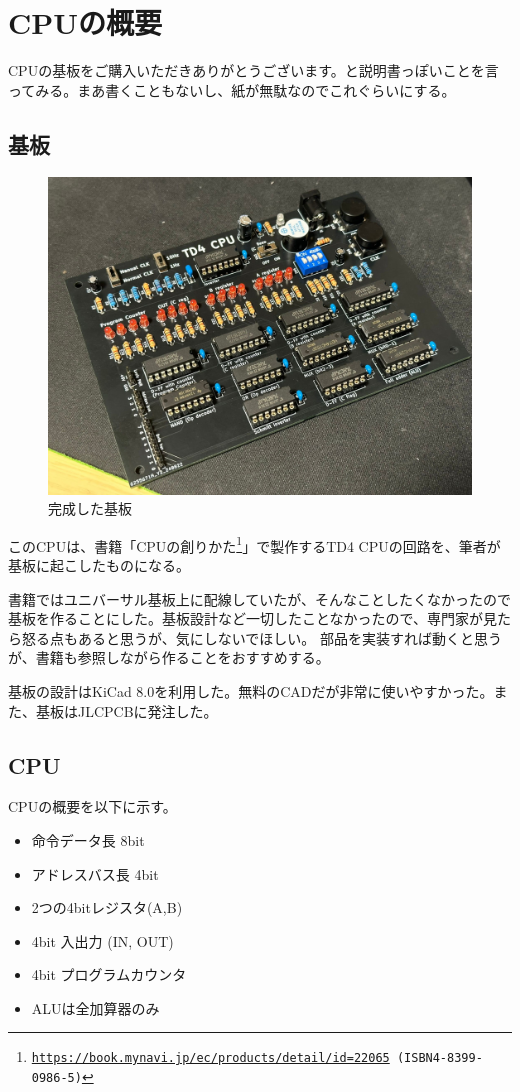 \documentclass[xelatex,a5paper,ja=standard, openany]{bxjsbook}
\title{}
\author{}
\date{}
\begin{document}
\tableofcontents

\chapter{CPUの概要}

CPUの基板をご購入いただきありがとうございます。と説明書っぽいことを言ってみる。まあ書くこともないし、紙が無駄なのでこれぐらいにする。

\section{基板}

\begin{figure}[h]
    \centering
    \includegraphics[width=0.6\linewidth]{figure/kiban.jpeg}
    \caption{完成した基板}
    \label{fig:kanseikiban}
\end{figure}

このCPUは、書籍「CPUの創りかた\footnote{\texttt{\url{https://book.mynavi.jp/ec/products/detail/id=22065} (ISBN4-8399-0986-5)}}」で製作するTD4 CPUの回路を、筆者が基板に起こしたものになる。\par
書籍ではユニバーサル基板上に配線していたが、そんなことしたくなかったので基板を作ることにした。基板設計など一切したことなかったので、専門家が見たら怒る点もあると思うが、気にしないでほしい。
部品を実装すれば動くと思うが、書籍も参照しながら作ることをおすすめする。\par

基板の設計はKiCad 8.0を利用した。無料のCADだが非常に使いやすかった。また、基板はJLCPCBに発注した。
\section{CPU}
CPUの概要を以下に示す。

\begin{itemize}
    \item 命令データ長 8bit
    \item アドレスバス長 4bit
    \item 2つの4bitレジスタ(A,B)
    \item 4bit 入出力 (IN, OUT)
    \item 4bit プログラムカウンタ
    \item ALUは全加算器のみ
\end{itemize}
\end{document}
